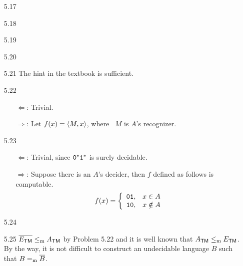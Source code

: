 \begin{itemize}
	\item[5.17]
	\Empty
	
	\item[5.18]
	\Empty
	
	\item[5.19]
	\Empty
	
	\item[5.20]
	\Empty
	
	\item[5.21]
	The hint in the textbook is sufficient.
	
	\item[5.22]
	\begin{itemize}
		\item[$\Leftarrow$:] Trivial.
		\item[$\Rightarrow$:] Let $f(x) = \Bra{M, x}$, where \TM\ $M$ is $A$'s recognizer. 
	\end{itemize}

	\item[5.23]
	\begin{itemize}
		\item[$\Leftarrow$:] Trivial, since $\TT{0}^*\TT{1}^*$ is surely decidable.
		\item[$\Rightarrow$:] Suppose there is an $A$'s decider, then $f$ defined as follows is computable.
		\[
			f(x) = 
			\left\{
				\begin{array}{ll}
					\TT{01}, & x \in A \\
					\TT{10}, & x \notin A
				\end{array}
			\right.
		\]
	\end{itemize}

	\item[5.24]
	\Empty
	
	\item[5.25]
	$\overline{E_{\TM}} \Leqm A_{\TM}$ by Problem 5.22 and it is well known that $A_{\TM} \Leqm E_{\TM}$. By the way, it is not difficult to construct an undecidable language $B$ such that $B =_{\RM{m}} \overline{B}$.
	
	\item[\Star 5.28]
	\Omit
	
\end{itemize}